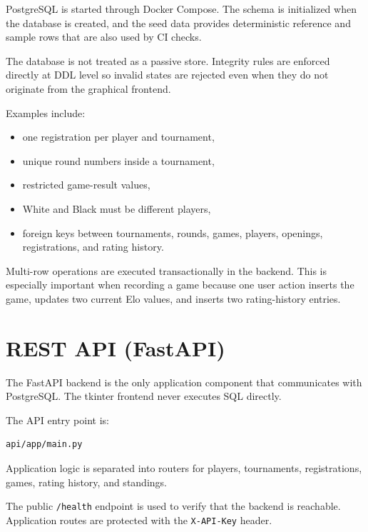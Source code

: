 \documentclass[11pt,a4paper]{article}
\begin{document}
PostgreSQL is started through Docker Compose. The schema is initialized when
the database is created, and the seed data provides deterministic reference and
sample rows that are also used by CI checks.

The database is not treated as a passive store. Integrity rules are enforced
directly at DDL level so invalid states are rejected even when they do not
originate from the graphical frontend.

Examples include:

\begin{itemize}[leftmargin=1.4em]
  \item one registration per player and tournament,
  \item unique round numbers inside a tournament,
  \item restricted game-result values,
  \item White and Black must be different players,
  \item foreign keys between tournaments, rounds, games, players, openings,
        registrations, and rating history.
\end{itemize}

Multi-row operations are executed transactionally in the backend. This is
especially important when recording a game because one user action inserts the
game, updates two current Elo values, and inserts two rating-history entries.

\section{REST API (FastAPI)}

The FastAPI backend is the only application component that communicates with
PostgreSQL. The tkinter frontend never executes SQL directly.

The API entry point is:

\begin{verbatim}
api/app/main.py
\end{verbatim}

Application logic is separated into routers for players, tournaments,
registrations, games, rating history, and standings.

The public \texttt{/health} endpoint is used to verify that the backend is
reachable. Application routes are protected with the
\texttt{X-API-Key} header.
\end{document}
